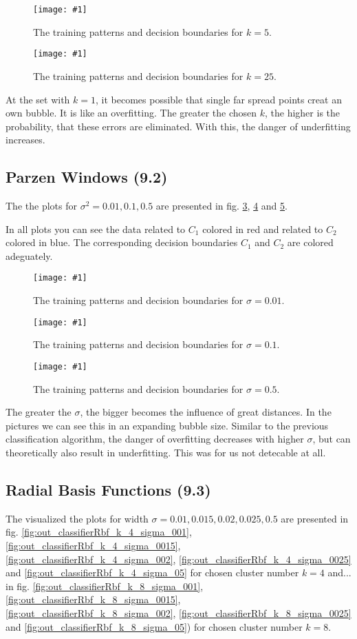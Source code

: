 \documentclass[a4paper,headings=small]{scrartcl}
\newcommand{\image}[3]{
\begin{figure}[htbp]
\centering
\texttt{[image: \#1]}
\caption{#3}
\label{fig:#1}
\end{figure}
}
\begin{document}
\image{out_classifierKnn_k_5}{0.8}%
	{The training patterns and decision boundaries for $k = 5$.}

\image{out_classifierKnn_k_25}{0.8}%
	{The training patterns and decision boundaries for $k = 25$.}

At the set with $k = 1$, it becomes possible that single far spread points creat an own bubble.
It is like an overfitting. The greater the chosen $k$, the higher is the probability, that these errors are eliminated.
With this, the danger of underfitting increases.


\subsection{Parzen Windows (9.2)}
The the plots for $\sigma^2 = 0.01, 0.1, 0.5$ are presented in fig.
\ref{fig:out_classifierParzen_sigma_001},
\ref{fig:out_classifierParzen_sigma_01} and
\ref{fig:out_classifierParzen_sigma_05}.

In all plots you can see the data related to $C_1$ colored in red and related to $C_2$ colored in blue.
The corresponding decision boundaries $C_1$ and $C_2$ are colored adeguately.

\image{out_classifierParzen_sigma_001}{0.8}%
	{The training patterns and decision boundaries for $\sigma = 0.01$.}

\image{out_classifierParzen_sigma_01}{0.8}%
	{The training patterns and decision boundaries for $\sigma = 0.1$.}

\image{out_classifierParzen_sigma_05}{0.8}%
	{The training patterns and decision boundaries for $\sigma = 0.5$.}

The greater the $\sigma$, the bigger becomes the influence of great distances.
In the pictures we can see this in an expanding bubble size.
Similar to the previous classification algorithm, the danger of overfitting decreases with higher $\sigma$,
but can theoretically also result in underfitting.
This was for us not detecable at all.


\subsection{Radial Basis Functions (9.3)}
The visualized the plots for width $\sigma = 0.01, 0.015, 0.02, 0.025, 0.5$ are presented in fig.
\ref{fig:out_classifierRbf_k_4_sigma_001},
\ref{fig:out_classifierRbf_k_4_sigma_0015},
\ref{fig:out_classifierRbf_k_4_sigma_002},
\ref{fig:out_classifierRbf_k_4_sigma_0025} and
\ref{fig:out_classifierRbf_k_4_sigma_05}
for chosen cluster number $k = 4$ and... in fig.
\ref{fig:out_classifierRbf_k_8_sigma_001},
\ref{fig:out_classifierRbf_k_8_sigma_0015},
\ref{fig:out_classifierRbf_k_8_sigma_002},
\ref{fig:out_classifierRbf_k_8_sigma_0025} and
\ref{fig:out_classifierRbf_k_8_sigma_05})
for chosen cluster number $k = 8$.
\end{document}
